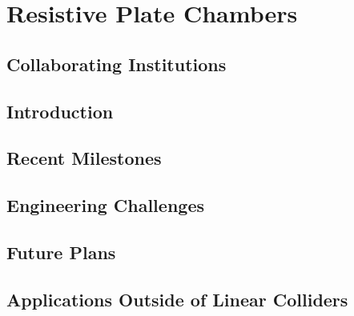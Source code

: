 \section{Resistive Plate Chambers}
\subsection{Collaborating Institutions}
\subsection{Introduction}
\subsection{Recent Milestones}
\subsection{Engineering Challenges}
\subsection{Future Plans}
\subsection{Applications Outside of Linear Colliders}
